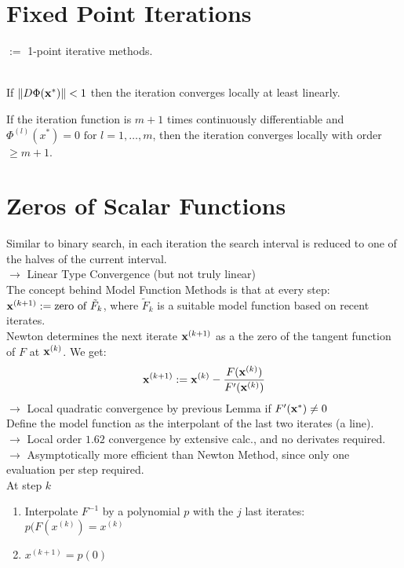 \section{Fixed Point Iterations}
$ := $ 1-point iterative methods.

 \\
If $\left\lVert D \Phi(\mathbf{x}^{*}) \right\rVert<1$ then the iteration converges locally at least linearly.

If the iteration function is $m+1$ times continuously differentiable and 
$\Phi^{(l)}\left(x^{*}\right)=0 \text { for } l=1, \ldots, m $, then the iteration converges locally with order $\geq m+1$.

\section{Zeros of Scalar Functions}

\Method[Bisection] Similar to binary search, in each iteration the search interval is reduced to one of the halves of the current interval.\\
$\rightarrow$ Linear Type Convergence (but not truly linear)\\

\Method[1D Newton] The concept behind Model Function Methods is that at every step: $\mathbf{x}^{(k+1)} := \text{zero of } \tilde{F}_k$, where $\tilde{F}_k$ is a suitable model function based on recent iterates. \\
Newton determines the next iterate $\mathbf{x}^{(k+1)}$ as a the zero of the tangent function of $F$ at $\mathbf{x}^{(k)}$. We get:
$$ \mathbf{x}^{(k+1)} := \mathbf{x}^{(k)} - \frac{F(\mathbf{x}^{(k)})}{F'(\mathbf{x}^{(k)})}$$
$\rightarrow$ Local quadratic convergence by previous Lemma if $F'(\mathbf{x}^{*})\neq 0$\\

 Define the model function as the interpolant of the last two iterates (a line). \\
$\rightarrow$ Local order $1.62$ convergence by extensive calc., and no derivates required.\\
$\rightarrow$ Asymptotically more efficient than Newton Method, since only one evaluation per step required. \\


 At step $k$
\begin{enumerate}
	\item Interpolate $F^{-1}$ by a polynomial $p$ with the $j$ last iterates: $p(F(x^{(k)}) = x^{(k)}$
	\item $x^{(k+1)} = p(0)$
\end{enumerate}

